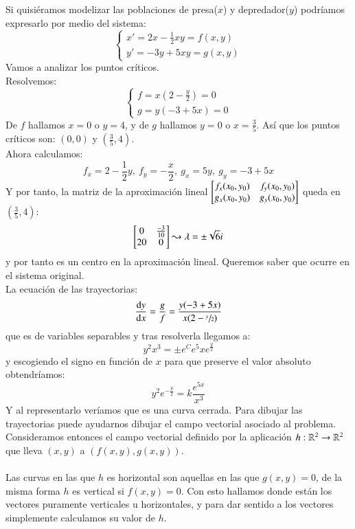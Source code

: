 \begin{eg} \label{eg:centr-centr}
    Si quisiéramos modelizar las poblaciones de presa($x$) y depredador($y$) podríamos expresarlo por medio del sistema:
    $$
        \begin{cases}
            x' = 2x - \frac{1}{2}xy = f(x, y)\\
            y' = -3y + 5xy = g(x, y)
        \end{cases}
    $$
    Vamos a analizar los puntos críticos.\\
    Resolvemos:
    $$
        \begin{cases}
        f = x(2-\frac{y}{2}) = 0\\
        g = y(-3+5x) = 0
        \end{cases}
    $$
    De $f$ hallamos $x=0$ o $y = 4$, y de $g$ hallamos $y = 0$ o $x = \frac{3}{5}$. Así que los puntos críticos son:
    $(0, 0)$ y $(\frac{3}{5}, 4)$.\\
    Ahora calculamos:
    $$
        f_x = 2 - \frac{1}{2}y,\ f_y = -\frac{x}{2},\ g_x = 5y,\ g_y = -3+5x
    $$
    Y por tanto, la matriz de la aproximación lineal $\mx{f_x(x_0, y_0) & f_y(x_0, y_0) \\ g_x(x_0, y_0) & g_y(x_0, y_0)}$ queda en $(\frac{3}{5}, 4)$:
    $$
        \mx{0 & \frac{-3}{10}\\ 20 & 0} \leadsto \lambda = \pm \sqrt{6}i
    $$
    y por tanto es un centro en la aproximación lineal. Queremos saber que ocurre en el sistema original.\\
    La ecuación de las trayectorias:
    $$
        \frac{\mathrm{d}y}{\mathrm{d}x} = \frac{g}{f} = \frac{y(-3+5x)}{x(2-\sfrac{y}{2})}
    $$
    que es de variables separables y tras resolverla llegamos a:
    $$
        y^2x^3 = \pm e^C e^5x e^{\frac{y}{2}}
    $$
    y escogiendo el signo en función de $x$ para que preserve el valor absoluto obtendríamos:
    $$
        y^2 e^{-\frac{y}{2}} = k \frac{e^{5x}}{x^3}
    $$
    Y al representarlo veríamos que es una curva cerrada. Para dibujar las trayectorias puede ayudarnos dibujar el campo vectorial asociado al problema.\\
    Consideramos entonces el campo vectorial definido por la aplicación $h:\mathbb{R}^2 \to \mathbb{R}^2$ que lleva $(x, y)$ a $(f(x, y), g(x, y))$.\\\\
    Las curvas en las que $h$ es horizontal son aquellas en las que $g(x, y) = 0$, de la misma forma $h$ es vertical si $f(x, y) = 0$. Con esto hallamos donde están los vectores puramente verticales u horizontales, y para dar sentido a los vectores simplemente calculamos su valor de $h$.

\end{eg}
